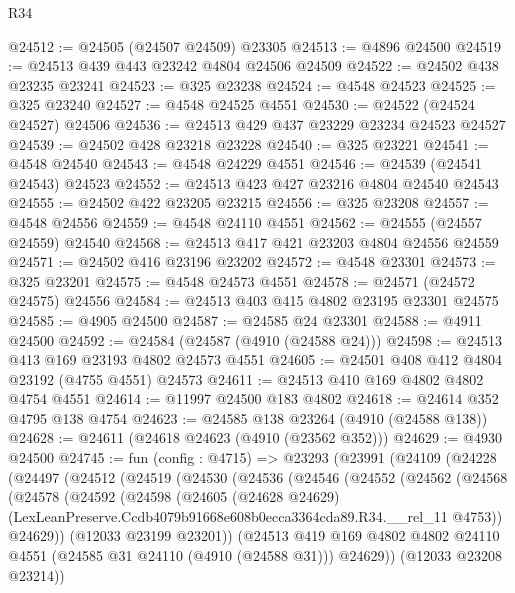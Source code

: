 \begin{lexlean}{R34}
\begin{coremodule}
@24512 := @24505 (@24507 @24509) @23305
@24513 := @4896 @24500
@24519 := @24513 @439 @443 @23242 @4804 @24506 @24509
@24522 := @24502 @438 @23235 @23241
@24523 := @325 @23238
@24524 := @4548 @24523
@24525 := @325 @23240
@24527 := @4548 @24525 @4551
@24530 := @24522 (@24524 @24527) @24506
@24536 := @24513 @429 @437 @23229 @23234 @24523 @24527
@24539 := @24502 @428 @23218 @23228
@24540 := @325 @23221
@24541 := @4548 @24540
@24543 := @4548 @24229 @4551
@24546 := @24539 (@24541 @24543) @24523
@24552 := @24513 @423 @427 @23216 @4804 @24540 @24543
@24555 := @24502 @422 @23205 @23215
@24556 := @325 @23208
@24557 := @4548 @24556
@24559 := @4548 @24110 @4551
@24562 := @24555 (@24557 @24559) @24540
@24568 := @24513 @417 @421 @23203 @4804 @24556 @24559
@24571 := @24502 @416 @23196 @23202
@24572 := @4548 @23301
@24573 := @325 @23201
@24575 := @4548 @24573 @4551
@24578 := @24571 (@24572 @24575) @24556
@24584 := @24513 @403 @415 @4802 @23195 @23301 @24575
@24585 := @4905 @24500
@24587 := @24585 @24 @23301
@24588 := @4911 @24500
@24592 := @24584 (@24587 (@4910 (@24588 @24)))
@24598 := @24513 @413 @169 @23193 @4802 @24573 @4551
@24605 := @24501 @408 @412 @4804 @23192 (@4755 @4551) @24573
@24611 := @24513 @410 @169 @4802 @4802 @4754 @4551
@24614 := @11997 @24500 @183 @4802
@24618 := @24614 @352 @4795 @138 @4754
@24623 := @24585 @138 @23264 (@4910 (@24588 @138))
@24628 := @24611 (@24618 @24623 (@4910 (@23562 @352)))
@24629 := @4930 @24500
@24745 := fun (config : @4715) =>
  @23293
    (@23991
      (@24109
        (@24228
          (@24497
            (@24512
              (@24519
                (@24530
                  (@24536
                    (@24546
                      (@24552
                        (@24562
                          (@24568
                            (@24578
                              (@24592
                                (@24598
                                  (@24605
                                    (@24628 @24629)
                                    (LexLeanPreserve.Ccdb4079b91668e608b0ecca3364cda89.R34.__rel_11
                                      @4753))
                                  @24629))
                              (@12033 @23199 @23201))
                            (@24513
                              @419
                              @169
                              @4802
                              @4802
                              @24110
                              @4551
                              (@24585 @31 @24110 (@4910 (@24588 @31)))
                              @24629))
                          (@12033 @23208 @23214))

\end{coremodule}
\end{lexlean}
